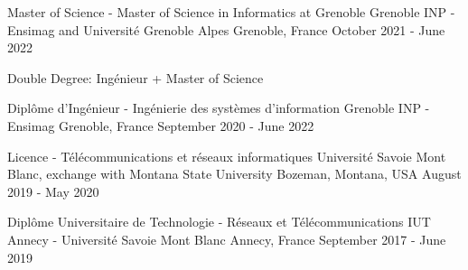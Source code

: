 

\begin{cventries}
\cventry
{Master of Science - Master of Science in Informatics at Grenoble} %
{Grenoble INP - Ensimag and Université Grenoble Alpes} %
{Grenoble, France} %
{October 2021 - June 2022} %
{
  \begin{cvitems}
    \item Double Degree: Ingénieur + Master of Science
  \end{cvitems}
}

\cventry
{Diplôme d'Ingénieur - Ingénierie des systèmes d'information} %
{Grenoble INP - Ensimag} %
{Grenoble, France} %
{September 2020 - June 2022} %
{
}

\cventry
{Licence - Télécommunications et réseaux informatiques} %
{Université Savoie Mont Blanc, exchange with Montana State University} %
{Bozeman, Montana, USA} %
{August 2019 - May 2020} %
{
}

\cventry
{Diplôme Universitaire de Technologie - Réseaux et Télécommunications} %
{IUT Annecy - Université Savoie Mont Blanc} %
{Annecy, France} %
{September 2017 - June 2019} %
{
}






\end{cventries}
